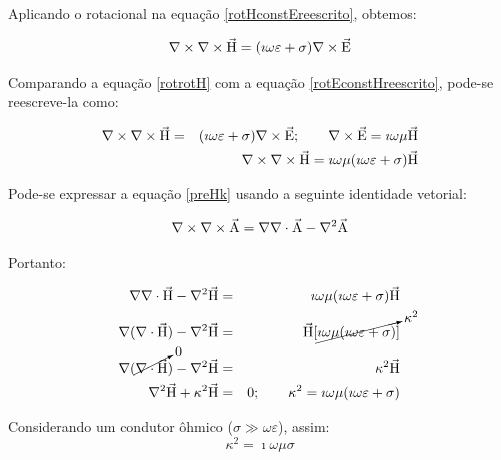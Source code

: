         Aplicando o rotacional na equação \ref{rotHconstEreescrito}, obtemos:
         
        \begin{equation}
            \label{rotrotH}
            \nabla \times \nabla \times \vec{\textrm{H}} = (\imath \omega \varepsilon + \sigma) \nabla \times \vec{\textrm{E}}
        \end{equation}

        Comparando a equação \ref{rotrotH} com a equação \ref{rotEconstHreescrito}, pode-se reescreve-la como:
        
        {\setlength\arraycolsep{2pt}
        \begin{eqnarray}
            \label{preHk}
            \nabla \times \nabla \times \vec{\textrm{H}} &=& (\imath \omega \varepsilon + \sigma) \nabla \times \vec{\textrm{E}}; \qquad \nabla \times \vec{\textrm{E}} = \imath \omega \mu \vec{\textrm{H}} \nonumber \\
            & &\nabla \times \nabla \times \vec{\textrm{H}} = \imath \omega \mu (\imath \omega \varepsilon + \sigma) \vec{\textrm{H}}            
        \end{eqnarray}}
        
        Pode-se expressar a equação \ref{preHk} usando a seguinte identidade vetorial:
        
        \begin{equation}
            \nabla \times \nabla \times \vec{\textrm{A}} = \nabla \nabla \cdot \vec{\textrm{A}} - \nabla^2 \vec{\textrm{A}} 
        \end{equation}

        \noindent Portanto:
        
        {\setlength\arraycolsep{2pt}
        \begin{eqnarray}
            \label{difH}
            \nabla \nabla \cdot \vec{\textrm{H}} - \nabla^2 \vec{\textrm{H}} & = & \imath \omega \mu (\imath \omega \varepsilon + \sigma) \vec{\textrm{H}} \nonumber \\
            \nabla (\nabla \cdot \vec{\textrm{H}}) - \nabla^2 \vec{\textrm{H}} & = & \vec{\textrm{H}}[\cancelto{\kappa^2}{\imath \omega \mu (\imath \omega \varepsilon + \sigma)}] \nonumber \\
            \nabla (\cancelto{0}{\nabla \cdot \vec{\textrm{H}}}) - \nabla^2 \vec{\textrm{H}} & = & \kappa^2 \vec{\textrm{H}} \nonumber \\
            \nabla^2 \vec{\textrm{H}} + \kappa^2 \vec{\textrm{H}} & = &  0; \qquad \kappa^2 = \imath \omega \mu (\imath \omega \varepsilon + \sigma)
        \end{eqnarray}}        
        
        Considerando um condutor ôhmico ($\sigma \gg \omega \varepsilon$), assim:
        \begin{equation}
            \label{kappaquad}
            \kappa^2 = \imath \omega \mu \sigma
        \end{equation}
        
